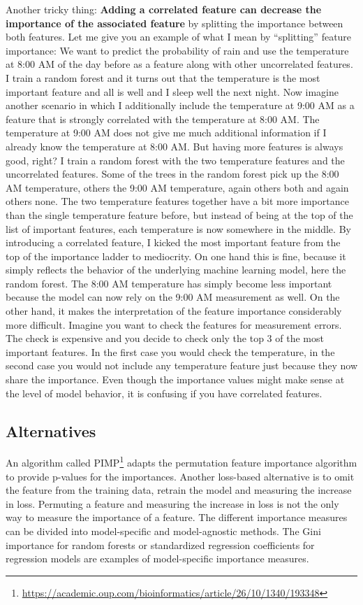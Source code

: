 \documentclass[
  11pt,
]{scrbook}
\renewcommand{\href}[2]{#2\footnote{\url{#1}}}
\begin{document}
Another tricky thing:
\textbf{Adding a correlated feature can decrease the importance of the associated feature} by splitting the importance between both features.
Let me give you an example of what I mean by ``splitting'' feature importance:
We want to predict the probability of rain and use the temperature at 8:00 AM of the day before as a feature along with other uncorrelated features.
I train a random forest and it turns out that the temperature is the most important feature and all is well and I sleep well the next night.
Now imagine another scenario in which I additionally include the temperature at 9:00 AM as a feature that is strongly correlated with the temperature at 8:00 AM.
The temperature at 9:00 AM does not give me much additional information if I already know the temperature at 8:00 AM.
But having more features is always good, right?
I train a random forest with the two temperature features and the uncorrelated features.
Some of the trees in the random forest pick up the 8:00 AM temperature, others the 9:00 AM temperature, again others both and again others none.
The two temperature features together have a bit more importance than the single temperature feature before, but instead of being at the top of the list of important features, each temperature is now somewhere in the middle.
By introducing a correlated feature, I kicked the most important feature from the top of the importance ladder to mediocrity.
On one hand this is fine, because it simply reflects the behavior of the underlying machine learning model, here the random forest.
The 8:00 AM temperature has simply become less important because the model can now rely on the 9:00 AM measurement as well.
On the other hand, it makes the interpretation of the feature importance considerably more difficult.
Imagine you want to check the features for measurement errors.
The check is expensive and you decide to check only the top 3 of the most important features.
In the first case you would check the temperature, in the second case you would not include any temperature feature just because they now share the importance.
Even though the importance values might make sense at the level of model behavior, it is confusing if you have correlated features.

\hypertarget{alternatives-1}{%
\subsection{Alternatives}\label{alternatives-1}}

An algorithm called \href{https://academic.oup.com/bioinformatics/article/26/10/1340/193348}{PIMP} adapts the permutation feature importance algorithm to provide p-values for the importances.
Another loss-based alternative is to omit the feature from the training data, retrain the model and measuring the increase in loss.
Permuting a feature and measuring the increase in loss is not the only way to measure the importance of a feature.
The different importance measures can be divided into model-specific and model-agnostic methods.
The Gini importance for random forests or standardized regression coefficients for regression models are examples of model-specific importance measures.
\end{document}
